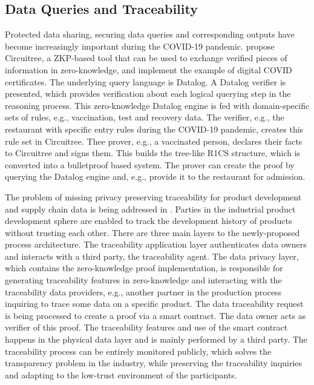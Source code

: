 \subsection{Data Queries and Traceability}
Protected data sharing, securing data queries and corresponding outputs have become increasingly important during the COVID-19 pandemic. \citet{Godden} propose Circuitree, a ZKP-based tool that can be used to exchange verified pieces of information in zero-knowledge, and implement the example of digital COVID certificates. The underlying query language is Datalog. A Datalog verifier is presented, which provides verification about each logical querying step in the reasoning process. This zero-knowledge Datalog engine is fed with domain-specific sets of rules, e.g., vaccination, test and recovery data. The verifier, e.g., the restaurant with specific entry rules during the COVID-19 pandemic, creates this rule set in Circuitree. Thee prover, e.g., a vaccinated person, declares their facts to Circuitree and signs them. This builds the tree-like R1CS structure, which is converted into a bulletproof based system. The prover can create the proof by querying the Datalog engine and, e.g., provide it to the restaurant for admission.

The problem of missing privacy preserving traceability for product development and supply chain data is being addressed in \citet{XueWang}. Parties in the industrial product development sphere are enabled to track the development history of products without trusting each other. There are three main layers to the newly-proposed process architecture. The traceability application layer authenticates data owners and interacts with a third party, the traceability agent. The data privacy layer, which contains the zero-knowledge proof implementation, is responsible for generating traceability features in zero-knowledge and interacting with the traceability data providers, e.g., another partner in the production process inquiring to trace some data on a specific product. The data traceability request is being processed to create a proof via a smart contract. The data owner acts as verifier of this proof. The traceability features and use of the smart contract happens in the physical data layer and is mainly performed by a third party. The traceability process can be entirely monitored publicly, which solves the transparency problem in the industry, while preserving the traceability inquiries and adapting to the low-trust environment of the participants.

